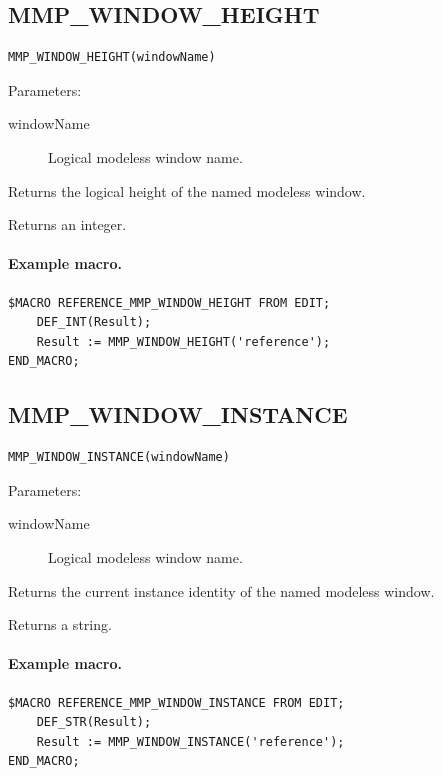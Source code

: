 \documentclass[a4paper,10pt,twoside,openany]{book}
\newenvironment{mrmacextension}{\begin{changebar}}{\end{changebar}}
\begin{document}
\begin{mrmacextension}
\label{prim:intrinsic-mmp-window-height}
\subsection*{MMP\_WINDOW\_HEIGHT}
\begin{verbatim}
MMP_WINDOW_HEIGHT(windowName)
\end{verbatim}
Parameters:
\begin{description}
\item[windowName] Logical modeless window name.
\end{description}

Returns the logical height of the named modeless window.

Returns an integer.

\paragraph{Example macro.}
\begin{verbatim}
$MACRO REFERENCE_MMP_WINDOW_HEIGHT FROM EDIT;
    DEF_INT(Result);
    Result := MMP_WINDOW_HEIGHT('reference');
END_MACRO;
\end{verbatim}
\end{mrmacextension}

\begin{mrmacextension}
\label{prim:intrinsic-mmp-window-instance}
\subsection*{MMP\_WINDOW\_INSTANCE}
\begin{verbatim}
MMP_WINDOW_INSTANCE(windowName)
\end{verbatim}
Parameters:
\begin{description}
\item[windowName] Logical modeless window name.
\end{description}

Returns the current instance identity of the named modeless window.

Returns a string.

\paragraph{Example macro.}
\begin{verbatim}
$MACRO REFERENCE_MMP_WINDOW_INSTANCE FROM EDIT;
    DEF_STR(Result);
    Result := MMP_WINDOW_INSTANCE('reference');
END_MACRO;
\end{verbatim}
\end{mrmacextension}
\end{document}
